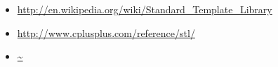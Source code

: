 


\begin{itemize}
\item \url{http://en.wikipedia.org/wiki/Standard_Template_Library}
\item \url{http://www.cplusplus.com/reference/stl/}
\item \url{~}
\end{itemize}	

